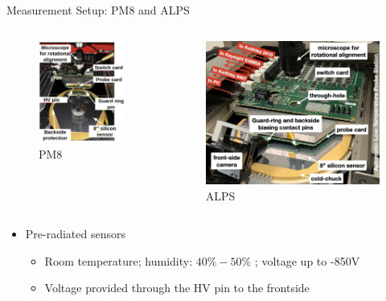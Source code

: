 \documentclass{beamer}
\begin{document}
\begin{frame}{Measurement Setup: PM8 and ALPS}
  \begin{columns}[b]
      \begin{figure}
          \includegraphics[width=.65\textwidth]{plots/PM8_description.png}
          \caption{PM8}
      \end{figure}
      \begin{figure}
          \includegraphics[width=.65\textwidth]{plots/ALPS_setup.png}
          \caption{ALPS}
      \end{figure}
  \end{columns}
    \begin{itemize}
        \small
        \item \alert{Pre-radiated} sensors
            \begin{itemize}
                \scriptsize
                \item  Room temperature; humidity: $ 40\% - 50\%$ ;  voltage up to \alert{-850V}
                \item Voltage provided through the HV pin to the frontside
            \end{itemize}
    \end{itemize}
\end{frame}
\end{document}
